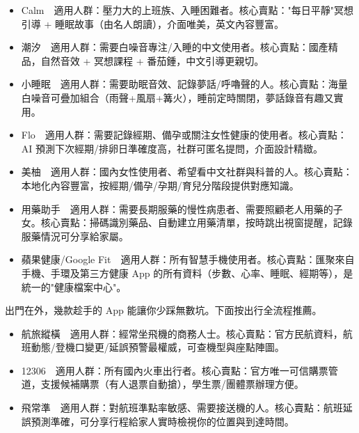 
\begin{itemize}
  \item Calm　適用人群：壓力大的上班族、入睡困難者。核心賣點："每日平靜"冥想引導 + 睡眠故事（由名人朗讀），介面唯美，英文內容豐富。
  \item 潮汐　適用人群：需要白噪音專注/入睡的中文使用者。核心賣點：國產精品，自然音效 + 冥想課程 + 番茄鍾，中文引導更親切。
  \item 小睡眠　適用人群：需要助眠音效、記錄夢話/呼嚕聲的人。核心賣點：海量白噪音可疊加組合（雨聲+風扇+篝火），睡前定時關閉，夢話錄音有趣又實用。
\end{itemize}


\begin{itemize}
  \item Flo　適用人群：需要記錄經期、備孕或關注女性健康的使用者。核心賣點：AI 預測下次經期/排卵日準確度高，社群可匿名提問，介面設計精緻。
  \item 美柚　適用人群：國內女性使用者、希望看中文社群與科普的人。核心賣點：本地化內容豐富，按經期/備孕/孕期/育兒分階段提供對應知識。
\end{itemize}


\begin{itemize}
  \item 用藥助手　適用人群：需要長期服藥的慢性病患者、需要照顧老人用藥的子女。核心賣點：掃碼識別藥品、自動建立用藥清單，按時跳出視窗提醒，記錄服藥情況可分享給家屬。
\end{itemize}


\begin{itemize}
  \item 蘋果健康/Google Fit　適用人群：所有智慧手機使用者。核心賣點：匯聚來自手機、手環及第三方健康 App 的所有資料（步數、心率、睡眠、經期等），是統一的"健康檔案中心"。
\end{itemize}


出門在外，幾款趁手的 App 能讓你少踩無數坑。下面按出行全流程推薦。


\begin{itemize}
  \item 航旅縱橫　適用人群：經常坐飛機的商務人士。核心賣點：官方民航資料，航班動態/登機口變更/延誤預警最權威，可查機型與座點陣圖。
  \item 12306　適用人群：所有國內火車出行者。核心賣點：官方唯一可信購票管道，支援候補購票（有人退票自動搶），學生票/團體票辦理方便。
  \item 飛常準　適用人群：對航班準點率敏感、需要接送機的人。核心賣點：航班延誤預測準確，可分享行程給家人實時檢視你的位置與到達時間。
\end{itemize}

